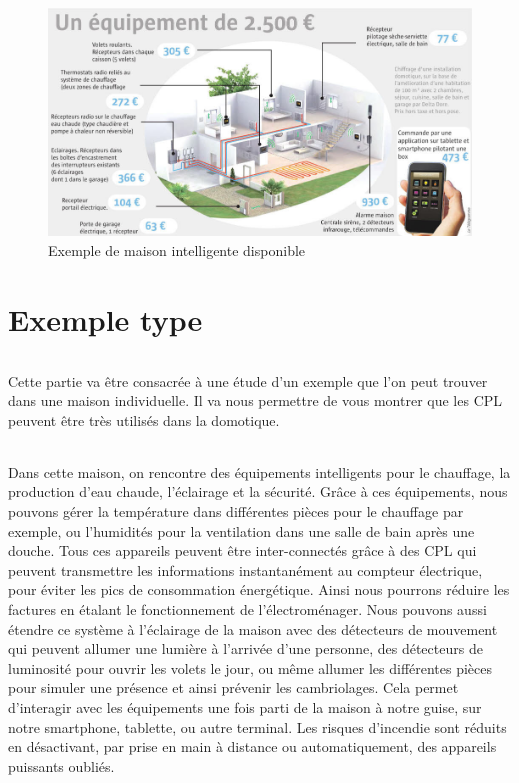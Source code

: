         \begin{figure}[h]
            \begin{center}
                \includegraphics[scale=1.5]{./images/cpl/exempleMaisonIntelligente.jpg}
            \end{center}
                \caption{ Exemple de maison intelligente disponible } %
                \label{Exemple de maison intelligente disponible}
        \end{figure}


    \clearpage
\part{Exemple type}
            \paragraph{}
Cette partie va être consacrée à une étude d’un exemple que l’on peut trouver dans une maison individuelle.
Il va nous permettre de vous montrer que les CPL peuvent être très utilisés dans la domotique.
            \paragraph{}
Dans cette maison, on rencontre des équipements intelligents pour le chauffage, la production d’eau chaude, l’éclairage et la sécurité.
Grâce à ces équipements, nous pouvons gérer la température dans différentes pièces pour le chauffage par exemple, ou l'humidités pour la ventilation dans une salle de bain après une douche.
Tous ces appareils peuvent être inter-connectés grâce à des CPL qui peuvent transmettre les informations instantanément au compteur électrique, pour éviter les pics de consommation énergétique.
Ainsi nous pourrons réduire les factures en étalant le fonctionnement de l'électroménager.
Nous pouvons aussi étendre ce système à l’éclairage de la maison avec des détecteurs de mouvement qui peuvent allumer une lumière à l’arrivée d’une personne,
des détecteurs de luminosité pour ouvrir les volets le jour, ou même allumer les différentes pièces pour simuler une présence et ainsi prévenir les cambriolages.
Cela permet d'interagir avec les équipements une fois parti de la maison à notre guise, sur notre smartphone, tablette, ou autre terminal.
Les risques d’incendie sont réduits en désactivant, par prise en main à distance ou automatiquement, des appareils puissants oubliés.
